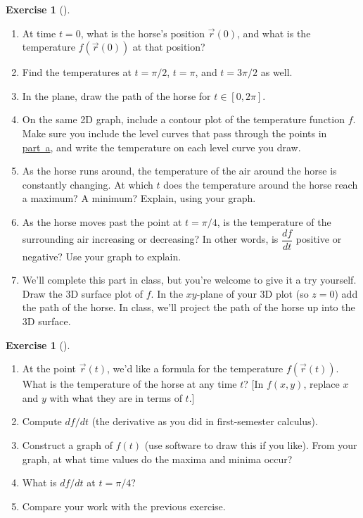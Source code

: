 \documentclass[10pt,]{book}
\theoremstyle{plain}
\theoremstyle{definition}
\theoremstyle{definition}
\theoremstyle{definition}
\theoremstyle{definition}
\newtheorem{exploration}[project]{Exercise}
\theoremstyle{definition}
\numberwithin{equation}{section}
\begin{document}
\begin{exploration}[]\label{prob_horse_track_chain}
\leavevmode%
\begin{enumerate}[font=\bfseries,label=(\alph*),ref=\alph*]
\item\label{item_1} At time \(t=0\), what is the horse's position \(\vec r(0)\), and what is the temperature \(f(\vec r(0))\) at that position?%
\item\label{task-342} Find the temperatures at \(t=\pi/2\), \(t=\pi\), and \(t=3\pi/2\) as well.%
\item\label{task-343} In the plane, draw the path of the horse for \(t\in [0,2\pi]\).%
\item\label{task-344} On the same 2D graph, include a contour plot of the temperature function \(f\). Make sure you include the level curves that pass through the points in \hyperref[item_1]{part~a}, and write the temperature on each level curve you draw. %
\item\label{task-345} As the horse runs around, the temperature of the air around the horse is constantly changing. At which \(t\) does the temperature around the horse reach a maximum?  A minimum?  Explain, using your graph. %
\item\label{item_2} As the horse moves past the point at \(t=\pi/4\), is the temperature of the surrounding air increasing or decreasing? In other words, is \(\dfrac{df}{dt}\) positive or negative? Use your graph to explain.%
\item\label{task-347} We'll complete this part in class, but you're welcome to give it a try yourself. Draw the 3D surface plot of \(f\). In the \(xy\)-plane of your 3D plot (so \(z=0\)) add the path of the horse. In class, we'll project the path of the horse up into the 3D surface.%
\end{enumerate}
\end{exploration}
\begin{exploration}[]\label{exploration-152}
\leavevmode%
\begin{enumerate}[font=\bfseries,label=(\alph*),ref=\alph*]
\item\label{task-348} At the point \(\vec r(t)\), we'd like a formula for the temperature \(f(\vec r(t))\). What is the temperature of the horse at any time \(t\)? [In \(f(x,y)\), replace \(x\) and \(y\) with what they are in terms of \(t\).]%
\item\label{task-349} Compute \(df/dt\) (the derivative as you did in first-semester calculus).%
\item\label{task-350} Construct a graph of \(f(t)\) (use software to draw this if you like). From your graph, at what time values do the maxima and minima occur?%
\item\label{task-351} What is \(df/dt\) at \(t=\pi/4\)?%
\item\label{task-352} Compare your work with the previous exercise.%
\end{enumerate}
\end{exploration}
\end{document}
